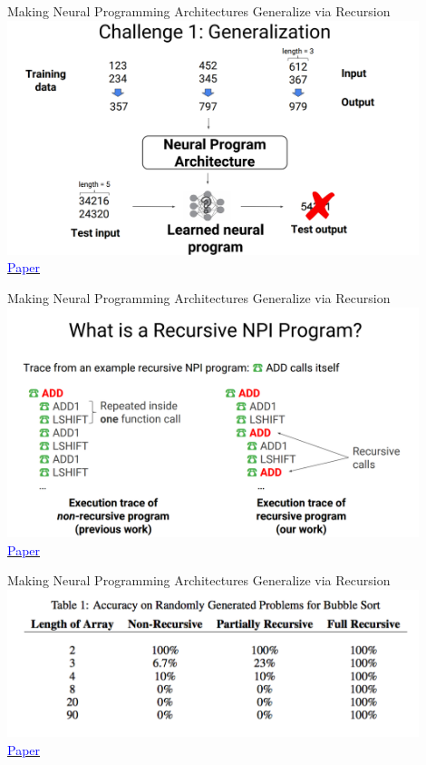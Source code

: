 \documentclass[]{beamer}
\begin{document}
\begin{frame}{Making Neural Programming Architectures Generalize via Recursion}
\centering
\includegraphics[width=0.9\textwidth]{figures/cai-challenge-generalization} \\
\href{https://openreview.net/forum?id=BkbY4psgg}{\textcolor{blue}{Paper}}
\end{frame}

\begin{frame}{Making Neural Programming Architectures Generalize via Recursion}
\centering
\includegraphics[width=0.9\textwidth]{figures/cai-recursive-npi} \\
\href{https://openreview.net/forum?id=BkbY4psgg}{\textcolor{blue}{Paper}}
\end{frame}

\begin{frame}{Making Neural Programming Architectures Generalize via Recursion}
\centering
\includegraphics[width=0.9\textwidth]{figures/cai-results} \\
\href{https://openreview.net/forum?id=BkbY4psgg}{\textcolor{blue}{Paper}}
\end{frame}
\end{document}
